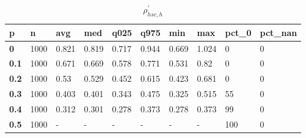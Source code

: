 \begin{table}[h]
 \centering 
\footnotesize
\caption{$\rho_{hsc,h}^\prime $}
\label{tab:alphahsch}
\begin{tabular}[h]{|l|l|l|l|l|l|l|l|l|l|
    } \hline
\textbf{ p} & \textbf{ n} & \textbf{ avg} & \textbf{ med} & \textbf{ q025} & \textbf{ q975} & \textbf{ min} & \textbf{ max} & \textbf{ pct\_0} & \textbf{ pct\_nan}
    \\ \hline
  \textbf{  0} & 1000 & 0.821 & 0.819 & 0.717 & 0.944 & 0.669 & 1.024 &   0 & 0
    \\ \hline
  \textbf{0.1} & 1000 & 0.671 & 0.669 & 0.578 & 0.771 & 0.531 &  0.82 &   0 & 0
    \\ \hline
  \textbf{0.2} & 1000 &  0.53 & 0.529 & 0.452 & 0.615 & 0.423 & 0.681 &   0 & 0
    \\ \hline
  \textbf{0.3} & 1000 & 0.403 & 0.401 & 0.343 & 0.475 & 0.325 & 0.515 &  55 & 0
    \\ \hline
  \textbf{0.4} & 1000 & 0.312 & 0.301 & 0.278 & 0.373 & 0.278 & 0.373 &  99 & 0
    \\ \hline
  \textbf{0.5} & 1000 & - & - & - & - & - & - & 100 & 0
    \\ \hline
 \end{tabular}
 \end{table}
